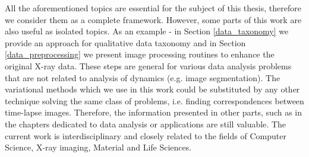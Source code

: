 All the aforementioned topics are essential for the subject of this thesis, therefore we consider them as a complete framework. However, some parts of this work are also useful as isolated topics.  As an example - in Section \ref{data_taxonomy} we provide an approach for qualitative data taxonomy and in Section \ref{data_preprocessing}  we present image processing routines to enhance the original X-ray data. These steps are general for various data analysis problems that are not related to analysis of dynamics (e.g. image segmentation). The variational \opticalflow methods which we use in this work could be substituted by any other technique solving the same class of problems, i.e. finding correspondences between time-lapse images. Therefore, the information presented in other parts, such as in the chapters dedicated to data analysis or applications are still valuable. The current work is interdisciplinary and closely related to the fields of Computer Science, X-ray imaging, Material and Life Sciences.

 




